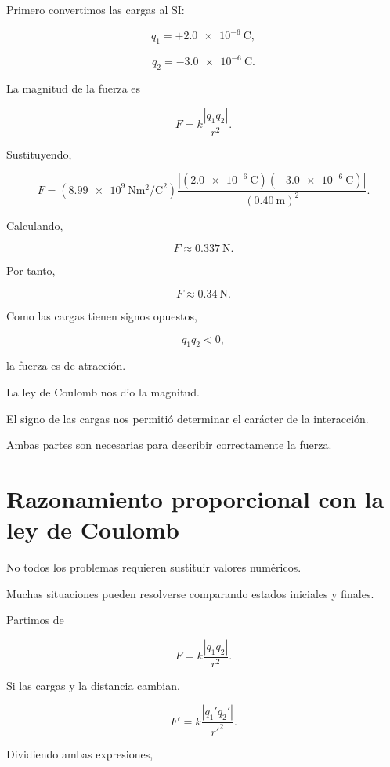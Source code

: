 Primero convertimos las cargas al SI:

\[
q_1
=
+\SI{2.0e-6}{\coulomb},
\]

\[
q_2
=
-\SI{3.0e-6}{\coulomb}.
\]

La magnitud de la fuerza es

\[
F
=
k\frac{|q_1q_2|}{r^2}.
\]

Sustituyendo,

\[
F
=
\left(
\SI{8.99e9}{\newton\metre\squared\per\coulomb\squared}
\right)
\frac{
\left|
(\SI{2.0e-6}{\coulomb})
(-\SI{3.0e-6}{\coulomb})
\right|
}{
(\SI{0.40}{\metre})^2
}.
\]

Calculando,

\[
F
\approx
\SI{0.337}{\newton}.
\]

Por tanto,

\[
\boxed{
F\approx\SI{0.34}{\newton}
}.
\]

Como las cargas tienen signos opuestos,

\[
q_1q_2<0,
\]

la fuerza es de atracción.

\begin{interpretacion}

La ley de Coulomb nos dio la magnitud.

El signo de las cargas nos permitió determinar el carácter de la
interacción.

Ambas partes son necesarias para describir correctamente la fuerza.

\end{interpretacion}



\section{Razonamiento proporcional con la ley de Coulomb}

No todos los problemas requieren sustituir valores numéricos.

Muchas situaciones pueden resolverse comparando estados iniciales y finales.

Partimos de

\[
F
=
k\frac{|q_1q_2|}{r^2}.
\]

Si las cargas y la distancia cambian,

\[
F'
=
k\frac{|q_1'q_2'|}{r'^2}.
\]

Dividiendo ambas expresiones,

